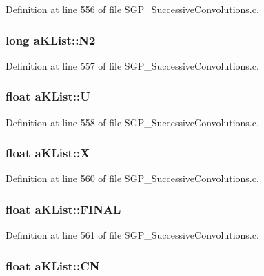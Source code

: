 Definition at line 556 of file SGP\_\-SuccessiveConvolutions.c.\hypertarget{structaKList_eb032f9fbd7c2bcfb5dd8aa39ab5d9ca}{
\subsubsection[N2]{\setlength{\rightskip}{0pt plus 5cm}long {\bf aKList::N2}}}
\label{d8/d05/structaKList_eb032f9fbd7c2bcfb5dd8aa39ab5d9ca}




Definition at line 557 of file SGP\_\-SuccessiveConvolutions.c.\hypertarget{structaKList_f2b99409b52c2dc9d8b02fc56da43cfc}{
\subsubsection[U]{\setlength{\rightskip}{0pt plus 5cm}float {\bf aKList::U}}}
\label{d8/d05/structaKList_f2b99409b52c2dc9d8b02fc56da43cfc}




Definition at line 558 of file SGP\_\-SuccessiveConvolutions.c.\hypertarget{structaKList_19fc2ddf4681376b993415651c9372a3}{
\subsubsection[X]{\setlength{\rightskip}{0pt plus 5cm}float {\bf aKList::X}}}
\label{d8/d05/structaKList_19fc2ddf4681376b993415651c9372a3}




Definition at line 560 of file SGP\_\-SuccessiveConvolutions.c.\hypertarget{structaKList_66f7d2757439f53392f0f09558b5ca8a}{
\subsubsection[FINAL]{\setlength{\rightskip}{0pt plus 5cm}float {\bf aKList::FINAL}}}
\label{d8/d05/structaKList_66f7d2757439f53392f0f09558b5ca8a}




Definition at line 561 of file SGP\_\-SuccessiveConvolutions.c.\hypertarget{structaKList_ad305c1a736325b5913e74c88d024a64}{
\subsubsection[CN]{\setlength{\rightskip}{0pt plus 5cm}float {\bf aKList::CN}}}
\label{d8/d05/structaKList_ad305c1a736325b5913e74c88d024a64}





